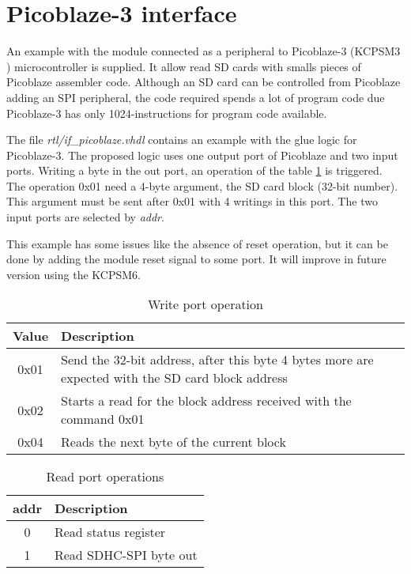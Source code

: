 \documentclass[oneside]{article}
\begin{document}
\section*{Picoblaze-3 interface}

An example with the module connected as a peripheral to Picoblaze-3 
(KCPSM3 \cite{picoblaze.2011}) 
microcontroller is supplied.  It allow read SD cards with smalls pieces of 
Picoblaze assembler code. Although an SD card can be controlled from Picoblaze 
adding an SPI peripheral, the code required spends a lot of program code due 
Picoblaze-3 has only 1024-instructions for program code available.

The file \emph{rtl/if\_picoblaze.vhdl} contains an example with
the glue logic for Picoblaze-3. The proposed logic uses one output port of 
Picoblaze and two  input ports.
Writing a byte in the out port, an operation of the table 
\ref{tab-pico-outport} is triggered. The operation 0x01 need a 4-byte argument,
the SD card block (32-bit number). This argument must be sent after 0x01 with 4 
writings in this port. The two input ports are selected by \emph{addr}.

This example has some issues like the absence of reset operation, but it can be 
done by adding the module reset signal to some port. It will improve in future 
version using the KCPSM6.



\begin{table}[htp]

\centering
\begin{tabular}{ | c l | }
\hline
  \bfseries Value & \bfseries Description \\
 \hline
  0x01 & Send the 32-bit address, after this byte 4 bytes more are expected with 
the SD card block address \\
  0x02 & Starts a read for the block address received with the command 0x01 \\
  0x04 & Reads the next byte of the current block \\
 \hline
\end{tabular}
\caption{Write port operation}
\label{tab-pico-outport}
\end{table}


\begin{table}[htp]
\centering
\begin{tabular}{ | c l | }
\hline
  \bfseries addr & \bfseries Description \\
 \hline
  0 &  Read status register\\
  1 &  Read SDHC-SPI byte out\\
 \hline
\end{tabular}
\caption{Read port operations}
\label{tab-read-operations}
\end{table}
\end{document}
